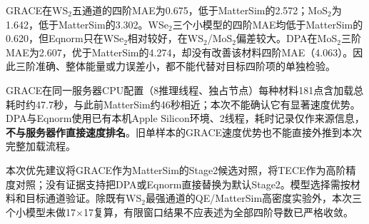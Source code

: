 GRACE在WS$_2$五通道的四阶MAE为0.675，低于MatterSim的2.572；MoS$_2$为1.642，低于MatterSim的3.302。WSe$_2$三个小模型的四阶MAE均低于MatterSim的0.620，但Eqnorm只在WSe$_2$相对较好，在WS$_2$/MoS$_2$偏差较大。DPA在MoS$_2$三阶MAE为2.607，优于MatterSim的4.274，却没有改善该材料四阶MAE（4.063）。因此三阶准确、整体能量或力误差小，都不能代替对目标四阶项的单独检验。

GRACE在同一服务器CPU配置（8推理线程、独占节点）每种材料181点含加载总耗时约47.7秒，与此前MatterSim约46秒相近；本次不能确认它有显著速度优势。DPA与Eqnorm使用已有本机Apple Silicon环境、2线程，耗时记录仅作来源信息，\textbf{不与服务器作直接速度排名}。旧单样本的GRACE速度优势也不能直接外推到本次完整加载流程。

\begin{table}[!htbp]\centering\scriptsize
\caption{WS$_2$小模型逐通道系数。中央5$\times$5；三阶用强度、四阶保留符号。拟合RMSE为多项式对模型能量的残差（meV/超胞），不等于对QE误差。其余材料逐通道值保存于可复算JSON。}\label{tab:small-model-details}
\end{table}
本次优先建议将GRACE作为MatterSim的Stage2候选对照，将TECE作为高阶精度对照；没有证据支持把DPA或Eqnorm直接替换为默认Stage2。模型选择需按材料和目标通道验证。除既有WS$_2$最强通道的QE/MatterSim高密度实验外，本次三个小模型未做17$\times$17复算，有限窗口结果不应表述为全部四阶导数已严格收敛。
\FloatBarrier
